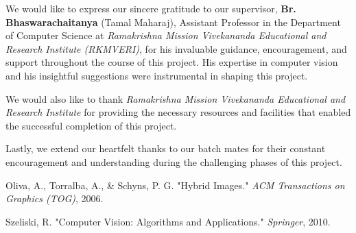 \documentclass[12pt]{report}
\begin{document}
We would like to express our sincere gratitude to our supervisor, \textbf{Br. Bhaswarachaitanya} (Tamal Maharaj), Assistant Professor in the Department of Computer Science at \textit{Ramakrishna Mission Vivekananda Educational and Research Institute (RKMVERI)}, for his invaluable guidance, encouragement, and support throughout the course of this project. His expertise in computer vision and his insightful suggestions were instrumental in shaping this project.

We would also like to thank \textit{Ramakrishna Mission Vivekananda Educational and Research Institute} for providing the necessary resources and facilities that enabled the successful completion of this project.

Lastly, we extend our heartfelt thanks to our batch mates for their constant encouragement and understanding during the challenging phases of this project.

\renewcommand{\bibname}{References}
\begin{thebibliography}{9}
  Oliva, A., Torralba, A., \& Schyns, P. G. "Hybrid Images." \textit{ACM Transactions on Graphics (TOG)}, 2006.

  Szeliski, R. "Computer Vision: Algorithms and Applications." \textit{Springer}, 2010.

\end{thebibliography}
\end{document}
